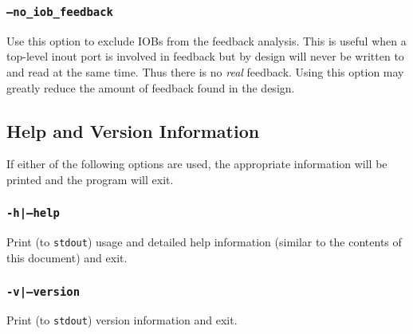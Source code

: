 \documentclass[english]{article}
\begin{document}
\subsubsection{\texttt{--no\_iob\_feedback}}
Use this option to exclude IOBs from the feedback analysis. This is useful when
a top-level inout port is involved in feedback but by design will never be 
written to and read at the same time. Thus there is no \emph{real} feedback.
Using this option may greatly reduce the amount of feedback found in the design.

\subsection{Help and Version Information}
If either of the following options are used, the appropriate information will be
printed and the program will exit.

\subsubsection{\texttt{-h|--help}}
Print (to \texttt{stdout}) usage and detailed help information (similar to the 
contents of this document) and exit.

\subsubsection{\texttt{-v|--version}}
Print (to \texttt{stdout}) version information and exit.
\end{document}
